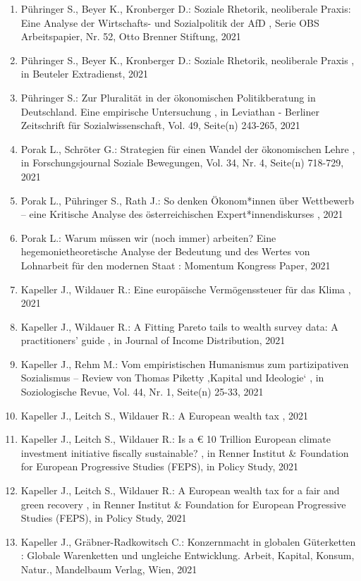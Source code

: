 \begin{enumerate}[leftmargin=*, labelsep=0.5cm]
	 \item Pühringer S., Beyer K., Kronberger D.:  Soziale Rhetorik, neoliberale Praxis: Eine Analyse der Wirtschafts- und Sozialpolitik der AfD  , Serie OBS Arbeitspapier, Nr. 52, Otto Brenner Stiftung, 2021
	 \item Pühringer S., Beyer K., Kronberger D.:  Soziale Rhetorik, neoliberale Praxis  , in Beuteler Extradienst, 2021
	 \item Pühringer S.:  Zur Pluralität in der ökonomischen Politikberatung in Deutschland. Eine empirische Untersuchung  , in Leviathan - Berliner Zeitschrift für Sozialwissenschaft, Vol. 49, Seite(n) 243-265, 2021
	 \item Porak L., Schröter G.:  Strategien für einen Wandel der ökonomischen Lehre  , in Forschungsjournal Soziale Bewegungen, Vol. 34, Nr. 4, Seite(n) 718-729, 2021
	 \item Porak L., Pühringer S., Rath J.:  So denken Ökonom*innen über Wettbewerb – eine Kritische Analyse des österreichischen Expert*innendiskurses  , 2021
	 \item Porak L.:  Warum müssen wir (noch immer) arbeiten? Eine hegemonietheoretische Analyse der Bedeutung und des Wertes von Lohnarbeit für den modernen Staat  : Momentum Kongress Paper, 2021
	 \item Kapeller J., Wildauer R.:  Eine europäische Vermögenssteuer für das Klima  , 2021
	 \item Kapeller J., Wildauer R.:  A Fitting Pareto tails to wealth survey data: A practitioners’ guide  , in Journal of Income Distribution, 2021
	 \item Kapeller J., Rehm M.:  Vom empiristischen Humanismus zum partizipativen Sozialismus – Review von Thomas Piketty ‚Kapital und Ideologie‘  , in Soziologische Revue, Vol. 44, Nr. 1, Seite(n) 25-33, 2021
	 \item Kapeller J., Leitch S., Wildauer R.:  A European wealth tax  , 2021
	 \item Kapeller J., Leitch S., Wildauer R.:  Is a € 10 Trillion European climate investment initiative fiscally sustainable?  , in Renner Institut & Foundation for European Progressive Studies (FEPS), in Policy Study, 2021
	 \item Kapeller J., Leitch S., Wildauer R.:  A European wealth tax for a fair and green recovery  , in Renner Institut & Foundation for European Progressive Studies (FEPS), in Policy Study, 2021
	 \item Kapeller J., Gräbner-Radkowitsch C.:  Konzernmacht in globalen Güterketten  : Globale Warenketten und ungleiche Entwicklung. Arbeit, Kapital, Konsum, Natur., Mandelbaum Verlag, Wien, 2021

\end{enumerate}
